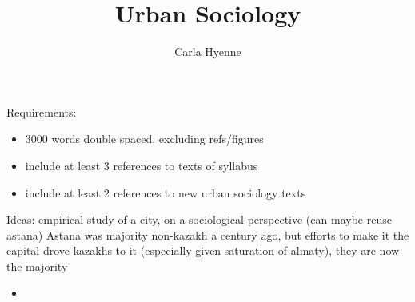 \documentclass{article}
\title{Urban Sociology}
\author{Carla Hyenne }
\begin{document}
\maketitle

Requirements:
\begin{itemize}
	\item 3000 words double spaced, excluding refs/figures
	\item include at least 3 references to texts of syllabus
	\item include at least 2 references to new urban sociology texts
\end{itemize}


Ideas: empirical study of a city, on a sociological perspective (can maybe reuse astana)
Astana was majority non-kazakh a century ago, but efforts to make it the capital drove kazakhs to it (especially given saturation of almaty), they are now the majority



\begin{itemize}
	\item
\end{itemize}
\end{document}
